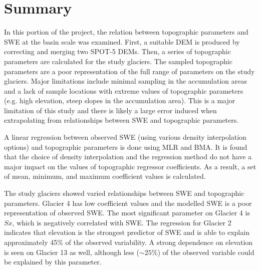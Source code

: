 \documentclass[12pt]{article}
\begin{document}

\section{Summary}

In this portion of the project, the relation between topographic parameters and SWE at the basin scale was examined. First, a suitable DEM is produced by correcting and merging two SPOT-5 DEMs. Then, a series of topographic parameters are calculated for the study glaciers. The sampled topographic parameters are a poor representation of the full range of parameters on the study glaciers. Major limitations include minimal sampling in the accumulation areas and a lack of sample locations with extreme values of topographic parameters (e.g. high elevation, steep slopes in the accumulation area). This is a major limitation of this study and there is likely a large error induced when extrapolating from relationships between SWE and topographic parameters. 

A linear regression between observed SWE (using various density interpolation options) and topographic parameters is done using MLR and BMA. It is found that the choice of density interpolation and the regression method do not have a major impact on the values of topographic regressor coefficients. As a result, a set of mean, minimum, and maximum coefficient values is calculated. 

The study glaciers showed varied relationships between SWE and topographic parameters. Glacier 4 has low coefficient values and the modelled SWE is a poor representation of observed SWE. The most significant parameter on Glacier 4 is $Sx$, which is negatively correlated with SWE. The regression for Glacier 2 indicates that elevation is the strongest predictor of SWE and is able to explain approximately 45\% of the observed variability.  A strong dependence on elevation is seen on Glacier 13 as well, although less ($\sim25\%$) of the observed variable could be explained by this parameter. 

 


	
	
	
\pagebreak


\end{document}
